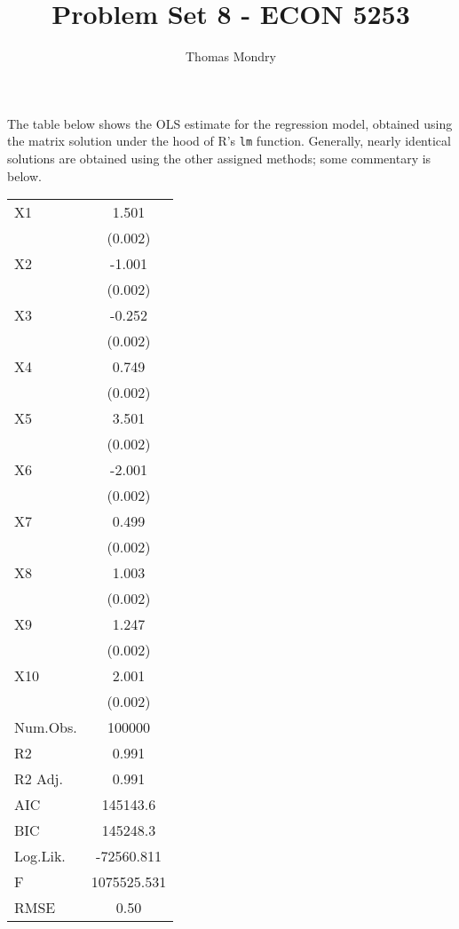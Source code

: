 \documentclass{article}
\title{Problem Set 8 - ECON 5253}
\author{Thomas Mondry}
\begin{document}
\maketitle

The table below shows the OLS estimate for the regression model, obtained using the matrix solution under the hood of R's \texttt{lm} function. Generally, nearly identical solutions are obtained using the other assigned methods; some commentary is below.

\begin{table}[H]
	\centering
	\begin{tabular}[t]{lc}
		\toprule
		X1 & 1.501\\
		& \vphantom{9} (0.002)\\
		X2 & -1.001\\
		& \vphantom{8} (0.002)\\
		X3 & -0.252\\
		& \vphantom{7} (0.002)\\
		X4 & 0.749\\
		& \vphantom{6} (0.002)\\
		X5 & 3.501\\
		& \vphantom{5} (0.002)\\
		X6 & -2.001\\
		& \vphantom{4} (0.002)\\
		X7 & 0.499\\
		& \vphantom{3} (0.002)\\
		X8 & 1.003\\
		& \vphantom{2} (0.002)\\
		X9 & 1.247\\
		& \vphantom{1} (0.002)\\
		X10 & 2.001\\
		& (0.002)\\
		\midrule
		Num.Obs. & 100000\\
		R2 & 0.991\\
		R2 Adj. & 0.991\\
		AIC & 145143.6\\
		BIC & 145248.3\\
		Log.Lik. & -72560.811\\
		F & 1075525.531\\
		RMSE & 0.50\\
		\bottomrule
	\end{tabular}
\end{table}
\end{document}
